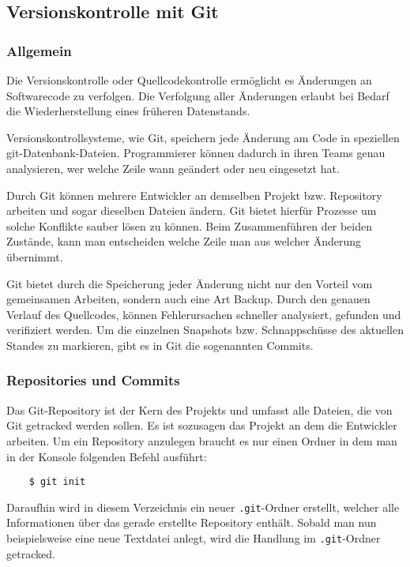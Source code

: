 \subsection{Versionskontrolle mit Git}
\subsubsection{Allgemein}

Die Versionskontrolle oder Quellcodekontrolle ermöglicht es Änderungen an
Softwarecode zu verfolgen. Die Verfolgung aller Änderungen erlaubt bei Bedarf
die Wiederherstellung eines früheren Datenstands.

Versionskontrollsysteme, wie Git, speichern jede Änderung am Code in speziellen
git-Datenbank-Dateien. Programmierer können dadurch in ihren Teams genau
analysieren, wer welche Zeile wann geändert oder neu eingesetzt hat.

Durch Git können mehrere Entwickler an demselben Projekt bzw. Repository
arbeiten und sogar dieselben Dateien ändern. Git bietet hierfür Prozesse um
solche Konflikte sauber lösen zu können. Beim Zusammenführen der beiden
Zustände, kann man entscheiden welche Zeile man aus welcher Änderung übernimmt.

Git bietet durch die Speicherung jeder Änderung nicht nur den Vorteil vom
gemeinsamen Arbeiten, sondern auch eine Art \glqq Backup\grqq{}. Durch den
genauen Verlauf des Quellcodes, können Fehlerursachen schneller analysiert,
gefunden und verifiziert werden. Um die einzelnen Snapshots bzw. Schnappschüsse
des aktuellen Standes zu markieren, gibt es in Git die sogenannten Commits.

\subsubsection{Repositories und Commits}
Das Git-Repository ist der Kern des Projekts und umfasst alle Dateien, die von
Git getracked werden sollen. Es ist sozusagen das Projekt an dem die Entwickler
arbeiten. Um ein Repository anzulegen braucht es nur einen Ordner in dem man
in der Konsole folgenden Befehl ausführt:
\begin{lstlisting}
    $ git init
\end{lstlisting}
Daraufhin wird in diesem Verzeichnis ein neuer \texttt{.git}-Ordner erstellt,
welcher alle Informationen über das gerade erstellte Repository enthält. Sobald
man nun beispielsweise eine neue Textdatei anlegt, wird die Handlung im
\texttt{.git}-Ordner getracked.


